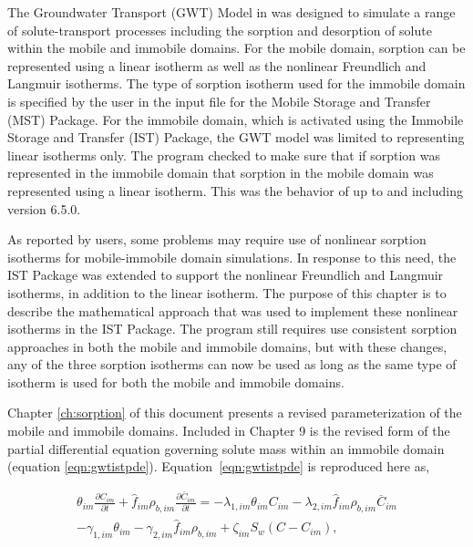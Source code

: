The Groundwater Transport (GWT) Model \citep{modflow6gwt} in \mf was designed to simulate a range of solute-transport processes including the sorption and desorption of solute within the mobile and immobile domains.  For the mobile domain, sorption can be represented using a linear isotherm as well as the nonlinear Freundlich and Langmuir isotherms.  The type of sorption isotherm used for the immobile domain is specified by the user in the input file for the Mobile Storage and Transfer (MST) Package.  For the immobile domain, which is activated using the Immobile Storage and Transfer (IST) Package, the GWT model was limited to representing linear isotherms only.  The program checked to make sure that if sorption was represented in the immobile domain that sorption in the mobile domain was represented using a linear isotherm.  This was the behavior of \mf up to and including version 6.5.0.

As reported by \mf users, some problems may require use of nonlinear sorption isotherms for mobile-immobile domain simulations.  In response to this need, the IST Package was extended to support the nonlinear Freundlich and Langmuir isotherms, in addition to the linear isotherm.  The purpose of this chapter is to describe the mathematical approach that was used to implement these nonlinear isotherms in the IST Package. The \mf program still requires use consistent sorption approaches in both the mobile and immobile domains, but with these changes, any of the three sorption isotherms can now be used as long as the same type of isotherm is used for both the mobile and immobile domains.

Chapter \ref{ch:sorption} of this document presents a revised parameterization of the mobile and immobile domains.  Included in Chapter 9 is the revised form of the partial differential equation governing solute mass within an immobile domain (equation \ref{eqn:gwtistpde}).  Equation~\ref{eqn:gwtistpde} is reproduced here as,

\begin{equation}
\label{eqn:gwtistpde2}
\begin{split}
\theta_{im} \frac{\partial C_{im} }{\partial t} + \hat{f}_{im} \rho_{b,im} \frac{\partial \overline{C}_{im}}{\partial t} = 
- \lambda_{1,im} \theta_{im} C_{im} - \lambda_{2,im}  \hat{f}_{im} \rho_{b,im} \overline{C}_{im} \\
- \gamma_{1,im} \theta_{im} - \gamma_{2,im} \hat{f}_{im} \rho_{b,im} 
+ \zeta_{im} S_w \left ( C - C_{im} \right ),
\end{split}
\end{equation}

